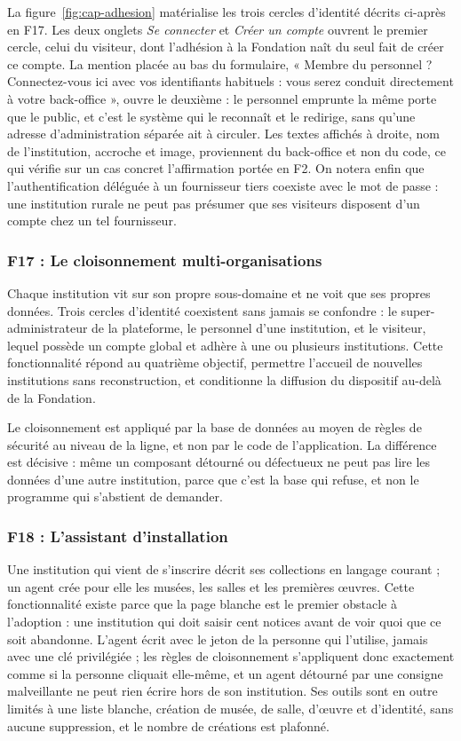 La figure~\ref{fig:cap-adhesion} matérialise les trois cercles d'identité
décrits ci-après en F17. Les deux onglets \emph{Se connecter} et \emph{Créer un
compte} ouvrent le premier cercle, celui du visiteur, dont l'adhésion à la
Fondation naît du seul fait de créer ce compte. La mention placée au bas du
formulaire, « Membre du personnel ? Connectez-vous ici avec vos identifiants
habituels : vous serez conduit directement à votre back-office », ouvre le
deuxième : le personnel emprunte la même porte que le public, et c'est le
système qui le reconnaît et le redirige, sans qu'une adresse d'administration
séparée ait à circuler. Les textes affichés à droite, nom de l'institution,
accroche et image, proviennent du back-office et non du code, ce qui vérifie sur
un cas concret l'affirmation portée en F2. On notera enfin que
l'authentification déléguée à un fournisseur tiers coexiste avec le mot de
passe : une institution rurale ne peut pas présumer que ses visiteurs disposent
d'un compte chez un tel fournisseur.

\subsubsection{F17 : Le cloisonnement multi-organisations}

Chaque institution vit sur son propre sous-domaine et ne voit que ses propres
données. Trois cercles d'identité coexistent sans jamais se confondre : le
super-administrateur de la plateforme, le personnel d'une institution, et le
visiteur, lequel possède un compte global et adhère à une ou plusieurs
institutions. Cette fonctionnalité répond au quatrième objectif, permettre
l'accueil de nouvelles institutions sans reconstruction, et conditionne la
diffusion du dispositif au-delà de la Fondation.

Le cloisonnement est appliqué par la base de données au moyen de règles de
sécurité au niveau de la ligne, et non par le code de l'application. La
différence est décisive : même un composant détourné ou défectueux ne peut pas
lire les données d'une autre institution, parce que c'est la base qui refuse, et
non le programme qui s'abstient de demander.

\subsubsection{F18 : L'assistant d'installation}

Une institution qui vient de s'inscrire décrit ses collections en langage
courant ; un agent crée pour elle les musées, les salles et les premières
œuvres. Cette fonctionnalité existe parce que la page blanche est le premier
obstacle à l'adoption : une institution qui doit saisir cent notices avant de
voir quoi que ce soit abandonne. L'agent écrit avec le jeton de la personne qui
l'utilise, jamais avec une clé privilégiée ; les règles de cloisonnement
s'appliquent donc exactement comme si la personne cliquait elle-même, et un
agent détourné par une consigne malveillante ne peut rien écrire hors de son
institution. Ses outils sont en outre limités à une liste blanche, création de
musée, de salle, d'œuvre et d'identité, sans aucune suppression, et le nombre de
créations est plafonné.

